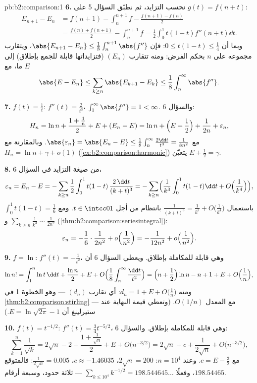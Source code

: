 \begin{solution}{pb:b2:comparison:1}
\textbf{6.} نحسب التزايد، ثم نطبّق السؤال 5 على
$g(t) = f(n + t)$:
\begin{align*}
E_{n+1} - E_n
&= f(n{+}1) - \int_n^{n+1}\!f - \frac{f(n{+}1) - f(n)}2 \\
&= \frac{f(n) + f(n{+}1)}2 - \int_n^{n+1}\!f
= \frac12\int_0^1 t(1-t)f''(n+t)\dd t .
\end{align*}
وبما أن $0 \leq t(1-t) \leq \frac14$: فإن $\abs{E_{n+1} - E_n} \leq
\frac18\int_n^{n+1}\abs{f''}$، ويتقارب مجموعه على $n$ بحكم
الفرض: ومنه تتقارب $(E_n)$ (فتزايداتها قابلة للجمع بإطلاق)
إلى $E$ ما، مع
\[
\abs{E - E_n} \leq \sum_{k\geq n}\abs{E_{k+1} - E_k} \leq
\frac18\int_n^\infty\abs{f''} .
\]

\textbf{7.} $f(t) = \frac1t$: $f''(t) = \frac2{t^3}$،
$\int_1^\infty\abs{f''} = 1 < \infty$. والسؤال 6:
\[
H_n = \ln n + \frac{1 + \frac1n}{2} + E + (E_n - E)
= \ln n + \Bigl(E + \frac12\Bigr) + \frac1{2n} +
\varepsilon_n,
\]
مع $\abs{\varepsilon_n} = \abs{E_n - E} \leq
\frac18\int_n^\infty\frac{2\dd t}{t^3} = \frac1{8n^2}$.
وبالمقارنة مع $H_n = \ln n + \gamma + o(1)$
(\cref{ex:b2:comparison:harmonic}) يتعيّن $E + \frac12 =
\gamma$.

\textbf{8.} من صيغة التزايد في السؤال 6،
\[
\varepsilon_n = E_n - E = -\sum_{k\geq n}\frac12\int_0^1
t(1-t)\,\frac{2\,\dd t}{(k+t)^3}
= -\sum_{k \geq n}\Bigl(\frac1{k^3}\int_0^1t(1-t)\dd t +
O\Bigl(\frac1{k^4}\Bigr)\Bigr),
\]
باستعمال $\frac{1}{(k+t)^3} = \frac1{k^3} +
O\bigl(\frac1{k^4}\bigr)$ بانتظام من أجل $t \in \intcc01$. ومع
$\int_0^1 t(1-t) = \frac16$ و
$\sum_{k\geq n}\frac1{k^3} \sim \frac{1}{2n^2}$
(\cref{thm:b2:comparison:seriesintegral}):
\[
\varepsilon_n = -\frac16\cdot\frac{1}{2n^2} +
o\Bigl(\frac1{n^2}\Bigr) = -\frac{1}{12n^2} +
o\Bigl(\frac{1}{n^2}\Bigr).
\]

\textbf{9.} $f = \ln$: $f''(t) = -\frac1{t^2}$، وهي قابلة
للمكاملة بإطلاق. ويعطي السؤال 6 أن
\[
\ln n! = \int_1^n\ln t\,\dd t + \frac{\ln n}2 + E + O\Bigl(
\frac1{8}\int_n^\infty\frac{\dd t}{t^2}\Bigr)
= \Bigl(n + \frac12\Bigr)\ln n - n + 1 + E +
O\Bigl(\frac1n\Bigr),
\]
ومنه $d_n = 1 + E + O\bigl(\frac1n\bigr)$: أي تقارب $(d_n)$
--- وهو الخطوة 1 في \cref{thm:b2:comparison:stirling} --- مع
المعدل $O(1/n)$. (وتعطي قيمة النهاية عند ستيرلينغ أن $E =
\ln\sqrt{2\pi} - 1$.)

\textbf{10.} $f(t) = t^{-1/2}$: $f''(t) = \frac34 t^{-5/2}$،
وهي قابلة للمكاملة بإطلاق. والسؤال 6:
\[
\sum_{k=1}^n \frac1{\sqrt k}
= 2\sqrt n - 2 + \frac{1 + \frac1{\sqrt n}}2 + E +
O\bigl(n^{-3/2}\bigr)
= 2\sqrt n + c + \frac{1}{2\sqrt n} +
O\bigl(n^{-3/2}\bigr),
\]
مع $c = E - \frac32$. وعند $n = 10^4$: $2\sqrt n = 200$، $c
\approx -1.46035$، $\frac1{2\sqrt n} = 0.005$: فالمتوقع
$198.54465$، وفعلًا $\sum_{k\leq10^4}k^{-1/2} =
198.544645\dots$ --- ثلاثة حدود، وسبعة أرقام.


\end{solution}
